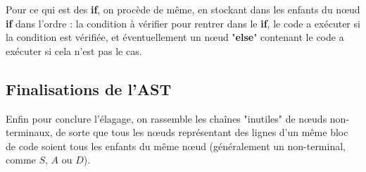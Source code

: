 \documentclass[a4paper, 12pt]{report}
\begin{document}
Pour ce qui est des \textbf{if}, on procède de même, en stockant dans les enfants du n{\oe}ud \textbf{if} dans l'ordre : la condition à vérifier pour rentrer dans le \textbf{if}, le code a exécuter si la condition est vérifiée, et éventuellement un n{\oe}ud "\textbf{else}" contenant le code a exécuter si cela n'est pas le cas.\\

\subsection{Finalisations de l'AST}

Enfin pour conclure l'élagage, on rassemble les chaînes "inutiles" de n{\oe}uds non-terminaux, de sorte que tous les n{\oe}uds représentant des lignes d'un même bloc de code soient tous les enfants du même n{\oe}ud (généralement un non-terminal, comme $S$, $A$ ou $D$).\\
\end{document}
